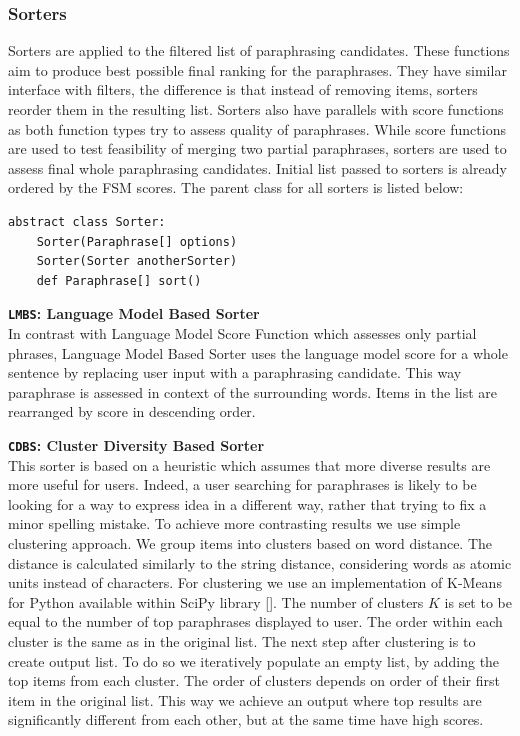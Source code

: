 \subsubsection{Sorters}

Sorters are applied to the filtered list of paraphrasing candidates. These functions aim to produce best possible final ranking for the paraphrases. They have similar interface with filters, the difference is that instead of removing items, sorters reorder them in the resulting list. Sorters also have parallels with score functions as both function types try to assess quality of paraphrases. While score functions are used to test feasibility of merging two partial paraphrases, sorters are used to assess final whole paraphrasing candidates. Initial list passed to sorters is already ordered by the FSM scores. The parent class for all sorters is listed below:

\begin{verbatim}
abstract class Sorter:
    Sorter(Paraphrase[] options)
    Sorter(Sorter anotherSorter)
    def Paraphrase[] sort()
\end{verbatim}


\begin{flushleft}

\textbf{\texttt{LMBS}: \textbf{Language Model Based Sorter}} \\
In contrast with Language Model Score Function which assesses only partial phrases, Language Model Based Sorter uses the language model score for a whole sentence by replacing user input with a paraphrasing candidate. This way paraphrase is assessed in context of the surrounding words. Items in the list are rearranged by score in descending order. 
\bigskip

\textbf{\texttt{CDBS}: \textbf{Cluster Diversity Based Sorter}} \\
This sorter is based on a heuristic which assumes that more diverse results are more useful for users. Indeed, a user searching for paraphrases is likely to be looking for a way to express idea in a different way, rather that trying to fix a minor spelling mistake. To achieve more contrasting results we use simple clustering approach. We group items into clusters based on word distance. The distance is calculated similarly to the string distance, considering words as atomic units instead of characters. For clustering we use an implementation of K-Means for Python available within SciPy library []. The number of clusters $K$ is set to be equal to the number of top paraphrases displayed to user. The order within each cluster is the same as in the original list. The next step after clustering is to create output list. To do so we iteratively populate an empty list, by adding the top items from each cluster. The order of clusters depends on order of their first item in the original list. This way we achieve an output where top results are significantly different from each other, but at the same time have high scores.
\bigskip

\end{flushleft}


